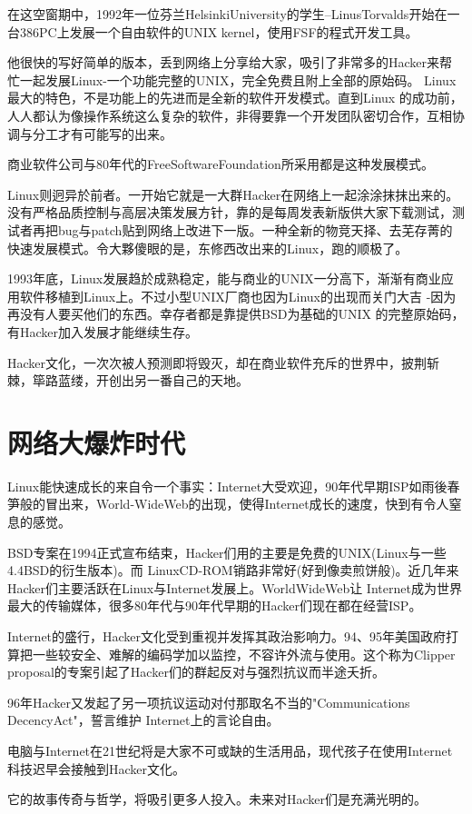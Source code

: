 \documentclass[a4paper,12pt,UTF8,twoside]{ctexbook}
\begin{document}
在这空窗期中，1992年一位芬兰HelsinkiUniversity的学生--LinusTorvalds开始在一台386PC上发展一个自由软件的UNIX kernel，使用FSF的程式开发工具。

他很快的写好简单的版本，丢到网络上分享给大家，吸引了非常多的Hacker来帮忙一起发展Linux-一个功能完整的UNIX，完全免费且附上全部的原始码。 Linux最大的特色，不是功能上的先进而是全新的软件开发模式。直到Linux 的成功前，人人都认为像操作系统这么复杂的软件，非得要靠一个开发团队密切合作，互相协调与分工才有可能写的出来。

商业软件公司与80年代的FreeSoftwareFoundation所采用都是这种发展模式。

Linux则迥异於前者。一开始它就是一大群Hacker在网络上一起涂涂抹抹出来的。 没有严格品质控制与高层决策发展方针，靠的是每周发表新版供大家下载测试，测试者再把bug与patch贴到网络上改进下一版。一种全新的物竞天择、去芜存菁的快速发展模式。令大夥傻眼的是，东修西改出来的Linux，跑的顺极了。

1993年底，Linux发展趋於成熟稳定，能与商业的UNIX一分高下，渐渐有商业应用软件移植到Linux上。不过小型UNIX厂商也因为Linux的出现而关门大吉 -因为再没有人要买他们的东西。幸存者都是靠提供BSD为基础的UNIX 的完整原始码，有Hacker加入发展才能继续生存。

Hacker文化，一次次被人预测即将毁灭，却在商业软件充斥的世界中，披荆斩棘，筚路蓝缕，开创出另一番自己的天地。

\chapter{网络大爆炸时代}

Linux能快速成长的来自令一个事实：Internet大受欢迎，90年代早期ISP如雨後春笋般的冒出来，World-WideWeb的出现，使得Internet成长的速度，快到有令人窒息的感觉。

BSD专案在1994正式宣布结束，Hacker们用的主要是免费的UNIX(Linux与一些4.4BSD的衍生版本)。而 LinuxCD-ROM销路非常好(好到像卖煎饼般)。近几年来Hacker们主要活跃在Linux与Internet发展上。WorldWideWeb让 Internet成为世界最大的传输媒体，很多80年代与90年代早期的Hacker们现在都在经营ISP。

Internet的盛行，Hacker文化受到重视并发挥其政治影响力。94、95年美国政府打算把一些较安全、难解的编码学加以监控，不容许外流与使用。这个称为Clipper proposal的专案引起了Hacker们的群起反对与强烈抗议而半途夭折。

96年Hacker又发起了另一项抗议运动对付那取名不当的"Communications DecencyAct"，誓言维护 Internet上的言论自由。

电脑与Internet在21世纪将是大家不可或缺的生活用品，现代孩子在使用Internet科技迟早会接触到Hacker文化。

它的故事传奇与哲学，将吸引更多人投入。未来对Hacker们是充满光明的。

\backmatter
\end{document}
